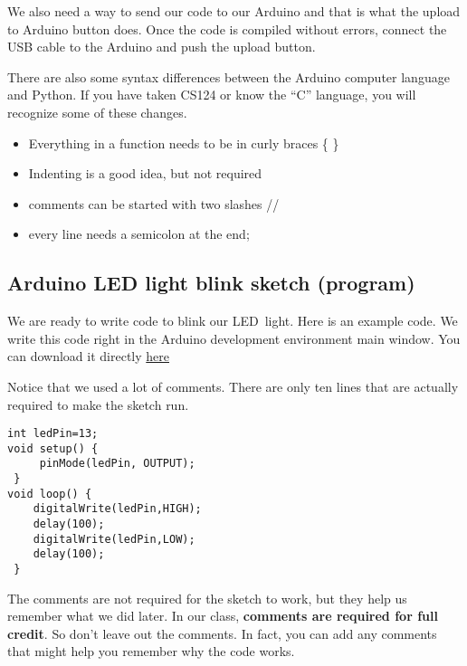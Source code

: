 We also need a way to send our code to our Arduino and that is what the upload to Arduino button does. Once the code is compiled without errors, connect the USB cable to the Arduino and push the upload button.

There are also some syntax differences between the Arduino computer language and Python. If you have taken CS124 or know the ``C'' language, you will recognize some of these changes.

\begin{itemize}
	\item Everything in a function needs to be in curly braces \{ \}
	\item Indenting is a good idea, but not required
	\item comments can be started with two slashes //
	\item every line needs a semicolon at the end;
\end{itemize}

\subsection{Arduino LED light blink sketch (program)}

We are ready to write code to blink our LED\ light. Here is an example code. We write this code right in the Arduino development environment main window. You can download it directly
\href{https://raw.githubusercontent.com/rtlines/IntermediateLabPH250/main/Code/IntroBlink.ino}{here}




Notice that we used a lot of comments. There are only ten lines that are
actually required to make the sketch run.

\begin{lstlisting}[language=Arduino] 
int ledPin=13;
void setup() {
	 pinMode(ledPin, OUTPUT);
 }
void loop() {
	digitalWrite(ledPin,HIGH);
	delay(100);
	digitalWrite(ledPin,LOW);
	delay(100);
 }
\end{lstlisting}

The comments are not required for the sketch to work, but they help us remember what we did later. In our class, \textbf{comments are required for full credit}. So don't leave out the comments. In fact, you can add any comments that might help you remember why the code works.

